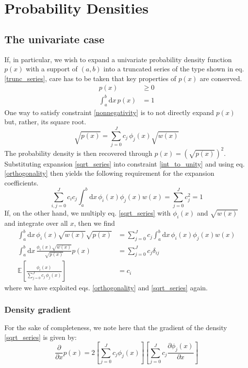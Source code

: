 \documentclass[]{report}
\begin{document}
\chapter{Probability Densities}
	\section{The univariate case}
	If, in particular, we wish to expand a univariate probability density function $p(x)$ with a support of $(a,b)$ into a truncated series of the type shown in eq. \ref{trunc_series}, care has to be taken that key properties of $p(x)$ are conserved.
	\begin{align}
		p(x) & \ge 0 \label{nonnegativity}\\
		\int_a^b\mathrm{d}x\,p(x) & = 1 \label{int_to_unity}
	\end{align}	
	One way to satisfy constraint \ref{nonnegativity} is to not directly expand $p(x)$ but, rather, its square root.
	\begin{equation}\label{sqrt_series}
		\sqrt{p(x)} = \sum_{j=0}^{J}c_j\,\phi_j(x)\sqrt{w(x)}
	\end{equation}
	The probability density is then recovered through $p(x)=\left(\sqrt{p(x)}\right)^2$. Substituting expansion \ref{sqrt_series} into constraint \ref{int_to_unity} and using eq. \ref{orthogonality} then yields the following requirement for the expansion coefficients.
	\begin{equation}\label{coeff_sqr_norm}
		\sum_{i, j=0}^{J}c_ic_j\int_a^b\mathrm{d}x\,\phi_i(x)\phi_j(x)w(x) = \sum_{j=0}^{J}c_j^2 = 1
	\end{equation}
	If, on the other hand,  we multiply eq. \ref{sqrt_series} with $\phi_i(x)$ and $\sqrt{w(x)}$ and integrate over all $x$, then we find
	\begin{align}\label{coefficients}
		\int_a^b\mathrm{d}x\,\phi_i(x)\sqrt{w(x)}\sqrt{p(x)} & = \sum_{j=0}^{J}c_j\int_a^b\mathrm{d}x\,\phi_i(x)\phi_j(x)w(x) \nonumber \\ 
		\int_a^b\mathrm{d}x\,\frac{\phi_i(x)\sqrt{w(x)}}{\sqrt{p(x)}}p(x) & = \sum_{j=0}^{J}c_j\delta_{ij} \\
		\mathbb{E}\left[\frac{\phi_i(x)}{\sum_{j=0}^{J}c_j\,\phi_j(x)}\right] & = c_i \nonumber
	\end{align}
	where we have exploited eqs. \ref{orthogonality} and \ref{sqrt_series} again.
	
		\subsection{Density gradient}
		For the sake of completeness, we note here that the gradient of the density \ref{sqrt_series} is given by:
		\begin{equation}
			\frac{\partial}{\partial x}p(x) = 2\left[\sum_{j=0}^Jc_j\phi_j(x)\right]\left[\sum_{j=0}^Jc_j\frac{\partial\phi_j(x)}{\partial x}\right]
		\end{equation}
	
\end{document}
